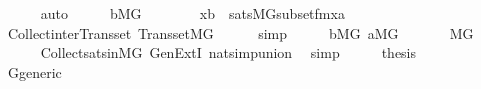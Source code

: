 \begin{isabellebody}
\ \ \ \ \isamarkupfalse%
\ auto\isanewline
\ \ \isamarkupfalse%
\ \isamarkupfalse%
\ {\isacartoucheopen}{\isacharquery}{\kern0pt}b{\isasymin}M{\isacharbrackleft}{\kern0pt}G{\isacharbrackright}{\kern0pt}{\isacartoucheclose}\ \isanewline
\ \ \isamarkupfalse%
\ {\isachardoublequoteopen}\ {\isachardot}{\kern0pt}{\isachardot}{\kern0pt}{\isachardot}{\kern0pt}\ {\isacharequal}{\kern0pt}\ {\isacharbraceleft}{\kern0pt}x{\isasymin}{\isacharquery}{\kern0pt}b\ {\isachardot}{\kern0pt}\ sats{\isacharparenleft}{\kern0pt}M{\isacharbrackleft}{\kern0pt}G{\isacharbrackright}{\kern0pt}{\isacharcomma}{\kern0pt}subset{\isacharunderscore}{\kern0pt}fm{\isacharparenleft}{\kern0pt}{}{\isacharcomma}{\kern0pt}{}{\isacharparenright}{\kern0pt}{\isacharcomma}{\kern0pt}{\isacharbrackleft}{\kern0pt}x{\isacharcomma}{\kern0pt}a{\isacharbrackright}{\kern0pt}{\isacharparenright}{\kern0pt}{\isacharbraceright}{\kern0pt}{\isachardoublequoteclose}\isanewline
\ \ \ \ \isamarkupfalse%
\ Collect{\isacharunderscore}{\kern0pt}inter{\isacharunderscore}{\kern0pt}Transset\ Transset{\isacharunderscore}{\kern0pt}MG\isanewline
\ \ \ \ \isamarkupfalse%
\ simp\isanewline
\ \ \isamarkupfalse%
\ \isamarkupfalse%
\ {\isacartoucheopen}{\isacharquery}{\kern0pt}b{\isasymin}M{\isacharbrackleft}{\kern0pt}G{\isacharbrackright}{\kern0pt}{\isacartoucheclose}\ {\isacartoucheopen}a{\isasymin}M{\isacharbrackleft}{\kern0pt}G{\isacharbrackright}{\kern0pt}{\isacartoucheclose}\isanewline
\ \ \isamarkupfalse%
\ {\isachardoublequoteopen}\ {\isachardot}{\kern0pt}{\isachardot}{\kern0pt}{\isachardot}{\kern0pt}\ {\isasymin}\ M{\isacharbrackleft}{\kern0pt}G{\isacharbrackright}{\kern0pt}{\isachardoublequoteclose}\isanewline
\ \ \ \ \isamarkupfalse%
\ Collect{\isacharunderscore}{\kern0pt}sats{\isacharunderscore}{\kern0pt}in{\isacharunderscore}{\kern0pt}MG\ GenExtI\ nat{\isacharunderscore}{\kern0pt}simp{\isacharunderscore}{\kern0pt}union\ \isamarkupfalse%
\ simp\isanewline
\ \ \isamarkupfalse%
\ \isamarkupfalse%
\ {\isacharquery}{\kern0pt}thesis\ \isacommand{{\isachardot}{\kern0pt}}\isamarkupfalse%
\isanewline
{}\isamarkupfalse%
%
\endisatagproof
{\isafoldproof}%
%
\isadelimproof
\isanewline
%
\endisadelimproof
{}\isamarkupfalse%
\ \isanewline
\isanewline
\isanewline
{}\isamarkupfalse%
\ G{\isacharunderscore}{\kern0pt}generic\ \isanewline

\end{isabellebody}
